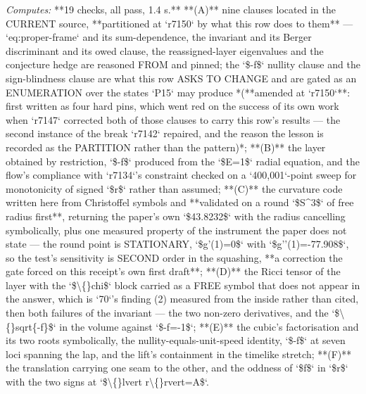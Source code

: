 \begin{description}
\emph{Computes:} **19 checks, all pass, 1.4 s.** **(A)** nine clauses located in the CURRENT source, **partitioned at `r7150` by what this row does to them** --- `eq:proper-frame` and its sum-dependence, the invariant and its Berger discriminant and its owed clause, the reassigned-layer eigenvalues and the conjecture hedge are reasoned FROM and pinned; the `\$-f\$` nullity clause and the sign-blindness clause are what this row ASKS TO CHANGE and are gated as an ENUMERATION over the states `P15` may produce *(**amended at `r7150`**: first written as four hard pins, which went red on the success of its own work when `r7147` corrected both of those clauses to carry this row's results --- the second instance of the break `r7142` repaired, and the reason the lesson is recorded as the PARTITION rather than the pattern)*; **(B)** the layer obtained by restriction, `\$-f\$` produced from the `\$E=1\$` radial equation, and the flow's compliance with `r7134`'s constraint checked on a `400,001`-point sweep for monotonicity of signed `\$r\$` rather than assumed; **(C)** the curvature code written here from Christoffel symbols and **validated on a round `\$S\textasciicircum{}3\$` of free radius first**, returning the paper's own `\$43.8232\$` with the radius cancelling symbolically, plus one measured property of the instrument the paper does not state --- the round point is STATIONARY, `\$g'(1)=0\$` with `\$g''(1)=-77.908\$`, so the test's sensitivity is SECOND order in the squashing, **a correction the gate forced on this receipt's own first draft**; **(D)** the Ricci tensor of the layer with the `\$\textbackslash\{\}chi\$` block carried as a FREE symbol that does not appear in the answer, which is `70`'s finding (2) measured from the inside rather than cited, then both failures of the invariant --- the two non-zero derivatives, and the `\$\textbackslash\{\}sqrt\{-f\}\$` in the volume against `\$-f=-1\$`; **(E)** the cubic's factorisation and its two roots symbolically, the nullity-equals-unit-speed identity, `\$-f\$` at seven loci spanning the lap, and the lift's containment in the timelike stretch; **(F)** the translation carrying one seam to the other, and the oddness of `\$f\$` in `\$r\$` with the two signs at `\$\textbackslash\{\}lvert r\textbackslash\{\}rvert=A\$`.

\end{description}
